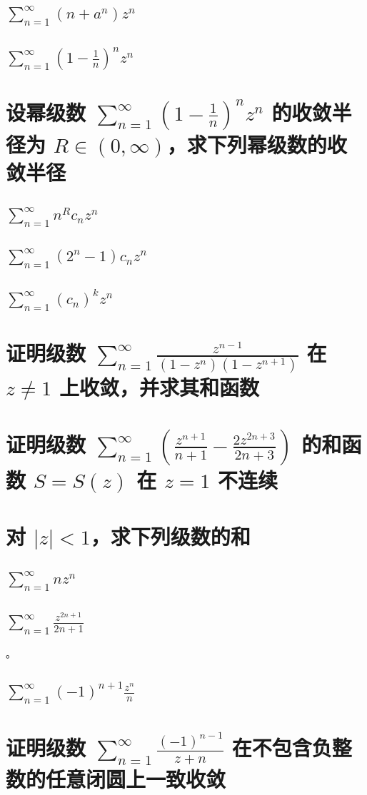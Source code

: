 \documentclass[UTF8]{report}
\theoremstyle{MyLineTheoremStyle} %
\theoremstyle{MyBlockTheoremStyle} %
\theoremstyle{MySubsubsectionStyle} %
\begin{document}
\subsection{$\sum_{n=1}^{\infty} (n + a^n) z^n$}
\subsection{$\sum_{n=1}^{\infty} (1 - \frac{1}{n})^n z^n$}

\section{设幂级数 $\sum_{n=1}^{\infty} (1 - \frac{1}{n})^n z^n$ 的收敛半径为 $R \in (0,\infty)$，求下列幂级数的收敛半径}

\subsection{$\sum_{n=1}^{\infty} n^Rc_n z^n$}
\subsection{$\sum_{n=1}^{\infty} (2^n - 1)c_n z^n$}
\subsection{$\sum_{n=1}^{\infty} (c_n)^k z^n$}

\section{证明级数 $\sum_{n=1}^{\infty} \frac{z^{n-1}}{(1 - z^n)(1 - z^{n+1})}$ 在 $ z \ne 1$ 上收敛，并求其和函数}

\section{证明级数 $\sum_{n=1}^{\infty} \left( \frac{z^{n+1}}{n+1} - \frac{2z^{2n+3}}{2n+3} \right)$ 的和函数 $S = S(z)$ 在 $z = 1$ 不连续}



\section{对 $| z | < 1$，求下列级数的和}



\subsection{$\sum_{n=1}^{\infty} n z^n$}
\subsection{$\sum_{n=1}^{\infty} \frac{z^{2n+1}}{2n+1}$}

。

\subsection{$\sum_{n=1}^{\infty} (-1)^{n+1}\frac{z^n}{n}$}

\section{证明级数 $\sum_{n=1}^{\infty} \frac{(-1)^{n-1}}{z + n}$ 在不包含负整数的任意闭圆上一致收敛}
\end{document}

